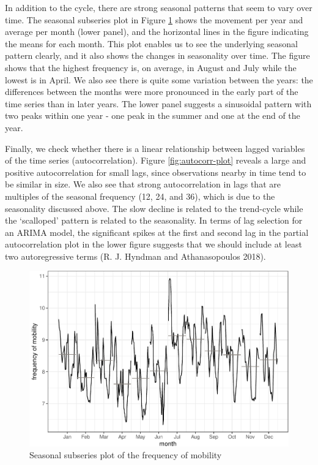 \documentclass[]{article}
\begin{document}
In addition to the cycle, there are strong seasonal patterns that seem
to vary over time. The seasonal subseries plot in Figure
\ref{fig:freq-month-plot} shows the movement per year and average per
month (lower panel), and the horizontal lines in the figure indicating
the means for each month. This plot enables us to see the underlying
seasonal pattern clearly, and it also shows the changes in seasonality
over time. The figure shows that the highest frequency is, on average,
in August and July while the lowest is in April. We also see there is
quite some variation between the years: the differences between the
months were more pronounced in the early part of the time series than in
later years. The lower panel suggests a sinusoidal pattern with two
peaks within one year - one peak in the summer and one at the end of the
year.

Finally, we check whether there is a linear relationship between lagged
variables of the time series (autocorrelation). Figure
\ref{fig:autocorr-plot} reveals a large and positive autocorrelation for
small lags, since observations nearby in time tend to be similar in
size. We also see that strong autocorrelation in lags that are multiples
of the seasonal frequency (12, 24, and 36), which is due to the
seasonality discussed above. The slow decline is related to the
trend-cycle while the `scalloped' pattern is related to the seasonality.
In terms of lag selection for an ARIMA model, the significant spikes at
the first and second lag in the partial autocorrelation plot in the
lower figure suggests that we should include at least two autoregressive
terms (R. J. Hyndman and Athanasopoulos 2018).

\begin{figure}
\centering
\includegraphics{../figs/freq--freq-month-plot-1.pdf}
\caption{\label{fig:freq-month-plot}Seasonal subseries plot of the frequency
of mobility}
\end{figure}
\end{document}
